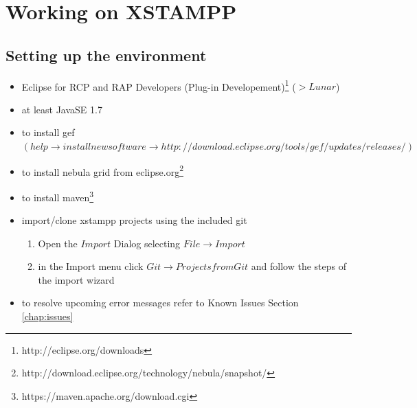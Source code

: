 \section{Working on XSTAMPP}

\subsection{Setting up the environment}
\begin{itemize}
\item Eclipse for RCP and RAP Developers (Plug-in Developement)\footnote{http://eclipse.org/downloads} ($> Lunar$)
\item at least JavaSE 1.7
\item to install gef $( help\rightarrow install new software\rightarrow http://download.eclipse.org/tools/gef/updates/releases/)$
\item to install nebula grid from eclipse.org\footnote{http://download.eclipse.org/technology/nebula/snapshot/}
\item to install maven\footnote{https://maven.apache.org/download.cgi}
\item import/clone xstampp projects using the included git
	\begin{enumerate}
	\item Open the $Import$ Dialog selecting $File\rightarrow Import$
	\item in the Import menu click $Git\rightarrow Projects from Git$ and follow the steps of the import wizard
	\end{enumerate}
\item to resolve upcoming error messages refer to Known Issues Section \ref{chap:issues}
\end{itemize}

